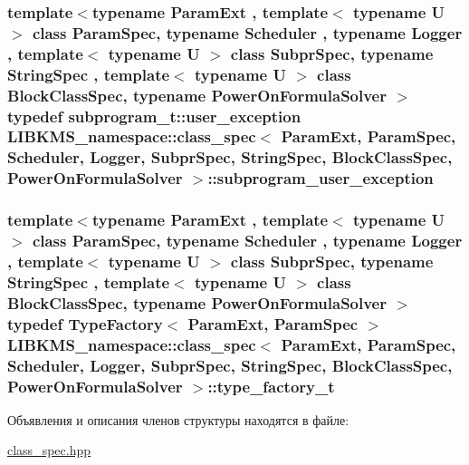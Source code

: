 \hypertarget{structLIBKMS__namespace_1_1class__spec_a7057878a7ac2cfcbdd6de37112e61b61}{
\subsubsection[{subprogram\-\_\-user\-\_\-exception}]{\setlength{\rightskip}{0pt plus 5cm}template$<$typename Param\-Ext , template$<$ typename U $>$ class Param\-Spec, typename Scheduler , typename Logger , template$<$ typename U $>$ class Subpr\-Spec, typename String\-Spec , template$<$ typename U $>$ class Block\-Class\-Spec, typename Power\-On\-Formula\-Solver $>$ typedef {\bf subprogram\-\_\-t\-::user\-\_\-exception} {\bf L\-I\-B\-K\-M\-S\-\_\-namespace\-::class\-\_\-spec}$<$ Param\-Ext, Param\-Spec, Scheduler, Logger, Subpr\-Spec, String\-Spec, Block\-Class\-Spec, Power\-On\-Formula\-Solver $>$\-::{\bf subprogram\-\_\-user\-\_\-exception}}}\label{structLIBKMS__namespace_1_1class__spec_a7057878a7ac2cfcbdd6de37112e61b61}
\hypertarget{structLIBKMS__namespace_1_1class__spec_a2abf5149a27867873b0c0463c3bb376b}{
\subsubsection[{type\-\_\-factory\-\_\-t}]{\setlength{\rightskip}{0pt plus 5cm}template$<$typename Param\-Ext , template$<$ typename U $>$ class Param\-Spec, typename Scheduler , typename Logger , template$<$ typename U $>$ class Subpr\-Spec, typename String\-Spec , template$<$ typename U $>$ class Block\-Class\-Spec, typename Power\-On\-Formula\-Solver $>$ typedef {\bf Type\-Factory}$<$ Param\-Ext, Param\-Spec $>$ {\bf L\-I\-B\-K\-M\-S\-\_\-namespace\-::class\-\_\-spec}$<$ Param\-Ext, Param\-Spec, Scheduler, Logger, Subpr\-Spec, String\-Spec, Block\-Class\-Spec, Power\-On\-Formula\-Solver $>$\-::{\bf type\-\_\-factory\-\_\-t}}}\label{structLIBKMS__namespace_1_1class__spec_a2abf5149a27867873b0c0463c3bb376b}


Объявления и описания членов структуры находятся в файле\-:\begin{DoxyCompactItemize}
\item 
\hyperlink{class__spec_8hpp}{class\-\_\-spec.\-hpp}\end{DoxyCompactItemize}
